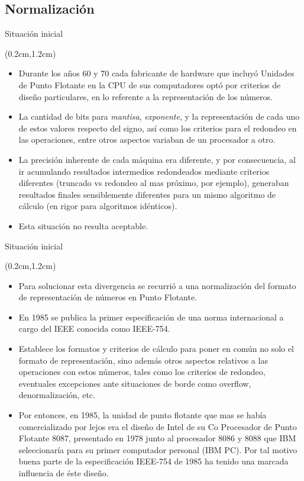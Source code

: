 \subsection{Normalización}
\begin{frame}{Situación inicial}
 \begin{textblock*}{\textwidth}(0.2cm,1.2cm)
  \begin{itemize} [<+->]\justifying \parskip .15cm
   \item Durante los años 60 y 70 cada fabricante de hardware que incluyó Unidades de Punto Flotante en la CPU de sus computadores optó por criterios de diseño particulares, en lo referente a la representación de los números.
   \item La cantidad de bits para \textit{mantisa}, \textit{exponente}, y la representación de cada uno de estos valores respecto del signo, así como los criterios para el redondeo en las operaciones, entre otros aspectos variaban de un procesador a otro.
   \item La precisión inherente de cada máquina era diferente, y por consecuencia, al ir acumulando resultados intermedios redondeados mediante criterios diferentes (truncado vs redondeo al mas próximo, por ejemplo), generaban resultados finales sensiblemente diferentes para un mismo algoritmo de cálculo (en rigor para algoritmos idénticos).
   \item Esta situación no resulta aceptable.
  \end{itemize}
 \end{textblock*}
\end{frame}

\begin{frame}{Situación inicial}
 \begin{textblock*}{\textwidth}(0.2cm,1.2cm)
  \begin{itemize} [<+->]\justifying \parskip .15cm
   \item Para solucionar esta divergencia se recurrió a una normalización del formato de representación de números en Punto Flotante.
   \item En 1985 se publica la primer especificación de una norma internacional a cargo del IEEE conocida como IEEE-754.
   \item Establece los formatos y criterios de cálculo para poner en común no solo el formato de representación, sino además otros aspectos relativos a las operaciones con estos números, tales como los criterios de redondeo, eventuales excepciones ante situaciones de borde como overflow, denormalización, etc.
   \item Por entonces, en 1985, la unidad de punto flotante que mas se había comercializado por lejos era el diseño de Intel de su Co Procesador de Punto Flotante 8087, presentado en 1978 junto al procesador 8086 y 8088 que IBM seleccionaría para su primer computador personal (IBM PC). Por tal motivo buena parte de la especificación IEEE-754 de 1985 ha tenido una marcada influencia de éste diseño.
  \end{itemize}
 \end{textblock*}
\end{frame}

